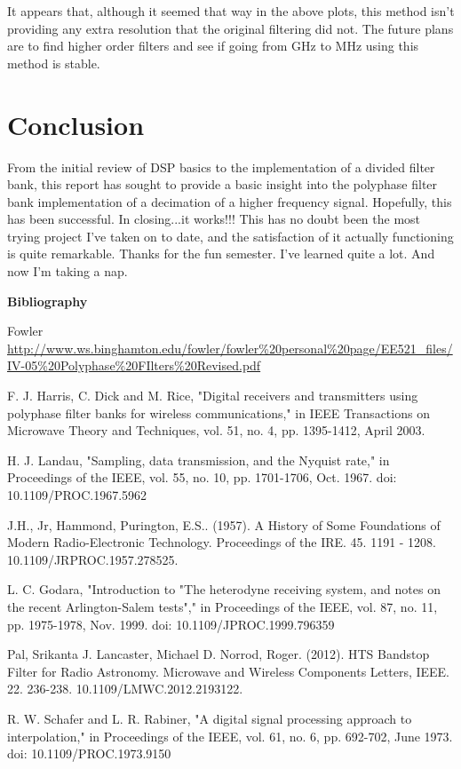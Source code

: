 \documentclass{report}
\begin{document}
It appears that, although it seemed that way in the above plots, this method isn't providing any extra resolution that the original filtering did not.  The future plans are to find higher order filters and see if going from GHz to MHz using this method is stable.

\chapter{Conclusion}

From the initial review of DSP basics to the implementation of a divided filter bank, this report has sought to provide a basic insight into the polyphase filter bank implementation of a decimation of a higher frequency signal.  Hopefully, this has been successful.  In closing...it works!!!  This has no doubt been the most trying project I've taken on to date, and the satisfaction of it actually functioning is quite remarkable.  Thanks for the fun semester.  I've learned quite a lot.  And now I'm taking a nap.

\newpage

\textbf{Bibliography}

Fowler \url{http://www.ws.binghamton.edu/fowler/fowler%20personal%20page/EE521_files/IV-05%20Polyphase%20FIlters%20Revised.pdf}

F. J. Harris, C. Dick and M. Rice, "Digital receivers and transmitters using polyphase filter banks for wireless communications," in IEEE Transactions on Microwave Theory and Techniques, vol. 51, no. 4, pp. 1395-1412, April 2003.

H. J. Landau, "Sampling, data transmission, and the Nyquist rate," in Proceedings of the IEEE, vol. 55, no. 10, pp. 1701-1706, Oct. 1967.
doi: 10.1109/PROC.1967.5962

J.H., Jr, Hammond,  Purington, E.S.. (1957). A History of Some Foundations of Modern Radio-Electronic Technology. Proceedings of the IRE. 45. 1191 - 1208. 10.1109/JRPROC.1957.278525. 

L. C. Godara, "Introduction to "The heterodyne receiving system, and notes on the recent Arlington-Salem tests"," in Proceedings of the IEEE, vol. 87, no. 11, pp. 1975-1978, Nov. 1999.
doi: 10.1109/JPROC.1999.796359

Pal, Srikanta  J. Lancaster, Michael D. Norrod, Roger. (2012). HTS Bandstop Filter for Radio Astronomy. Microwave and Wireless Components Letters, IEEE. 22. 236-238. 10.1109/LMWC.2012.2193122. 

R. W. Schafer and L. R. Rabiner, "A digital signal processing approach to interpolation," in Proceedings of the IEEE, vol. 61, no. 6, pp. 692-702, June 1973.
doi: 10.1109/PROC.1973.9150
\end{document}
